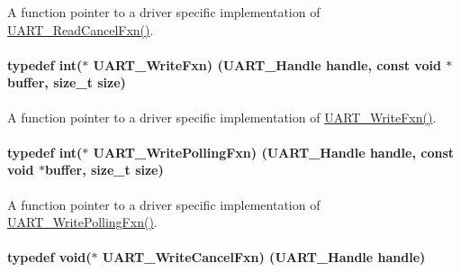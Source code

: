 A function pointer to a driver specific implementation of \hyperlink{_u_a_r_t_8h_aa46296acc2c197a775d44458e1eca197}{U\+A\+R\+T\+\_\+\+Read\+Cancel\+Fxn()}. 

\paragraph[{U\+A\+R\+T\+\_\+\+Write\+Fxn}]{\setlength{\rightskip}{0pt plus 5cm}typedef int($\ast$ U\+A\+R\+T\+\_\+\+Write\+Fxn) ({\bf U\+A\+R\+T\+\_\+\+Handle} handle, const void $\ast$buffer, size\+\_\+t size)}\label{_u_a_r_t_8h_abe7ee32e202ad90d912b27693fe33672}


A function pointer to a driver specific implementation of \hyperlink{_u_a_r_t_8h_abe7ee32e202ad90d912b27693fe33672}{U\+A\+R\+T\+\_\+\+Write\+Fxn()}. 

\paragraph[{U\+A\+R\+T\+\_\+\+Write\+Polling\+Fxn}]{\setlength{\rightskip}{0pt plus 5cm}typedef int($\ast$ U\+A\+R\+T\+\_\+\+Write\+Polling\+Fxn) ({\bf U\+A\+R\+T\+\_\+\+Handle} handle, const void $\ast$buffer, size\+\_\+t size)}\label{_u_a_r_t_8h_a68d0b77abdb9da6a868edc6529ae70ff}


A function pointer to a driver specific implementation of \hyperlink{_u_a_r_t_8h_a68d0b77abdb9da6a868edc6529ae70ff}{U\+A\+R\+T\+\_\+\+Write\+Polling\+Fxn()}. 

\paragraph[{U\+A\+R\+T\+\_\+\+Write\+Cancel\+Fxn}]{\setlength{\rightskip}{0pt plus 5cm}typedef void($\ast$ U\+A\+R\+T\+\_\+\+Write\+Cancel\+Fxn) ({\bf U\+A\+R\+T\+\_\+\+Handle} handle)}\label{_u_a_r_t_8h_ac5a3d974279a2d161746dfbc8ca91774}


